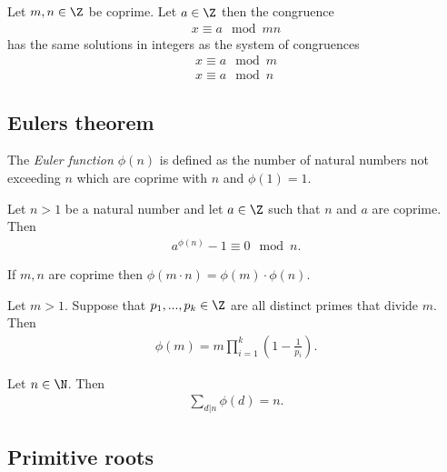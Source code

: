 \documentclass{article}
\begin{document}
\begin{theorem}[Lecture 5]
	Let $m,n\in\Z$ be coprime. Let $a\in\Z$ then the congruence
	\begin{align*}
		x \equiv a \mod mn
	\end{align*}
	has the same solutions in integers as the system of congruences
	\begin{align*}
		x \equiv a \mod m \\
		x \equiv a \mod n
	\end{align*}
\end{theorem}

\subsection{Eulers theorem}

\begin{definition}
	The \emph{Euler function $\phi(n)$} is defined as the number of natural numbers not exceeding
	$n$ which are coprime with $n$ and $\phi(1)=1$.
\end{definition}

\begin{theorem}[Euler]
	Let $n>1$ be a natural number and let $a\in\Z$ such that $n$ and $a$ are coprime. Then
	\begin{align*}
		a^{\phi(n)}-1 \equiv 0 \mod n.
	\end{align*}
\end{theorem}

\begin{theorem}
	If $m,n$ are coprime then $\phi(m\cdot n)=\phi(m)\cdot\phi(n)$.
\end{theorem}

\begin{theorem}
	Let $m>1$. Suppose that $p_1,...,p_k\in\Z$ are all distinct primes that divide $m$. Then
	\begin{align*}
		\phi(m) = m\prod_{i=1}^k \left(1-\frac{1}{p_i}\right).
	\end{align*}
\end{theorem}

\begin{theorem}
	Let $n\in\N$. Then
	\begin{align*}
		\sum_{d|n}\phi(d) = n.
	\end{align*}
\end{theorem}

\subsection{Primitive roots}
\end{document}
